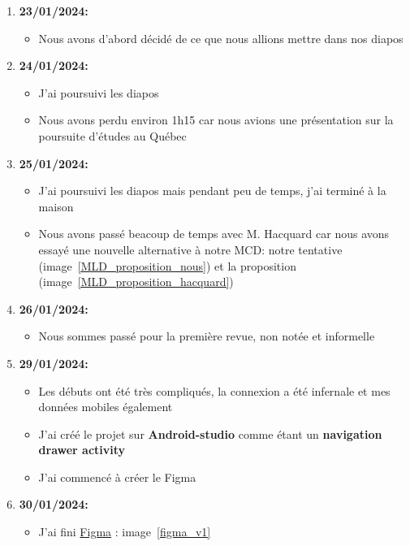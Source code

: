 \documentclass[10pt,a4paper]{book}
\begin{document}
\begin{enumerate}
\begin{itemize}
        \end{itemize}
    \item \textbf{23/01/2024:}
        \begin{itemize}
            \item Nous avons d'abord décidé de ce que nous allions mettre dans nos diapos
        \end{itemize}
    \item \textbf{24/01/2024:}
        \begin{itemize}
            \item J'ai poursuivi les diapos
            \item Nous avons perdu environ 1h15 car nous avions une présentation sur la poursuite d'études au Québec
        \end{itemize}
    \item \textbf{25/01/2024:}
        \begin{itemize}
            \item J'ai poursuivi les diapos mais pendant peu de temps, j'ai terminé à la maison
            \item Nous avons passé beacoup de temps avec M. Hacquard car nous avons essayé une nouvelle alternative à notre MCD: notre tentative (image~\ref{MLD_proposition_nous}) et la proposition (image~\ref{MLD_proposition_hacquard})
        \end{itemize}
    \item \textbf{26/01/2024:}
        \begin{itemize}
            \item Nous sommes passé pour la première revue, non notée et informelle
        \end{itemize}
    \item \textbf{29/01/2024:}
        \begin{itemize}
            \item Les débuts ont été très compliqués, la connexion a été infernale et mes données mobiles également
            \item J'ai créé le projet sur \textbf{Android-studio} comme étant un \textbf{navigation drawer activity}
            \item J'ai commencé à créer le Figma
        \end{itemize}
    \item \textbf{30/01/2024:}
        \begin{itemize}
            \item J'ai fini \href{https://www.figma.com/proto/0Jh7ikCgIu2jUc2U5tIpNI/Tracking-BLE?type=design&node-id=1-2&t=LAlJHjfGajoQFf8A-0&scaling=scale-down&page-id=0%3A1&starting-point-node-id=1%3A2}{Figma} : image~\ref{figma_v1}

\end{itemize}
\end{enumerate}
\end{document}
